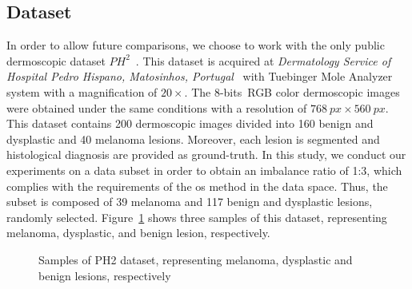 \subsection{Dataset}\label{sec:dataset}
In order to allow future comparisons, we choose to work with the only public dermoscopic dataset $PH^{2}$~\cite{barata2013two}.
This dataset is acquired at \textit{Dermatology Service of Hospital Pedro Hispano, Matosinhos, Portugal}~\cite{barata2013two} with Tuebinger Mole Analyzer system with a magnification of $20 \times$.
The 8-bits~RGB color dermoscopic images were obtained under the same conditions with a resolution of $\SI{768}{px} \times \SI{560}{px}$. 
This dataset contains 200 dermoscopic images divided into 160 benign and dysplastic and 40 melanoma lesions. 
Moreover, each lesion is segmented and histological diagnosis are provided as ground-truth. 
In this study, we conduct our experiments on a data subset in order to obtain an imbalance ratio of 1:3, which complies with the requirements of the \ac{os} method in the data space.
Thus, the subset is composed of 39 melanoma and 117 benign and dysplastic lesions, randomly selected. 
Figure~\ref{fig:PH2samples} shows three samples of this dataset, representing melanoma, dysplastic, and benign lesion, respectively. 

\begin{figure}
\begin{center}
  \hspace*{\fill}
  \hfill
  \hfill
  \hspace*{\fill}
  \caption{Samples of PH2 dataset, representing melanoma, dysplastic and benign lesions, respectively}
  \label{fig:PH2samples}
\end{center}	
\end{figure}

